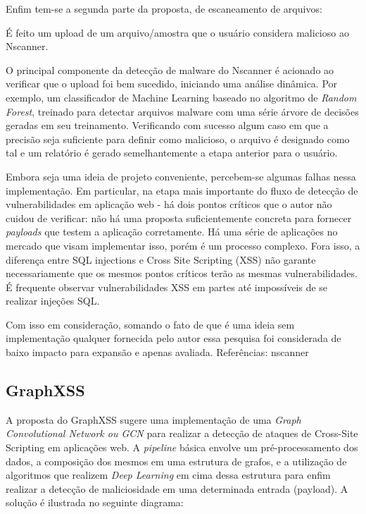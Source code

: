 Enfim tem-se a segunda parte da proposta, de escaneamento de arquivos:
\begin{alineas}
\item É feito um upload de um arquivo/amostra que o usuário considera malicioso ao Nscanner.
\item O principal componente da detecção de malware do Nscanner é acionado ao verificar que o upload foi bem sucedido, iniciando uma análise dinâmica. Por exemplo, um classificador de Machine Learning baseado no algoritmo de \textit{Random Forest}, treinado para detectar arquivos malware com uma série árvore de decisões geradas em seu treinamento. Verificando com sucesso algum caso em que a precisão seja suficiente para definir como malicioso, o arquivo é designado como tal e um relatório é gerado semelhantemente a etapa anterior para o usuário.
\end{alineas}

Embora seja uma ideia de projeto conveniente, percebem-se algumas falhas nessa implementação. Em particular, na etapa mais importante do fluxo de detecção de vulnerabilidades em aplicação web - há dois pontos críticos que o autor não cuidou de verificar: não há uma proposta suficientemente concreta para fornecer \textit{payloads} que testem a aplicação corretamente. Há uma série de aplicações no mercado que visam implementar isso, porém é um processo complexo. Fora isso, a diferença entre SQL injections e Cross Site Scripting (XSS) não garante necessariamente que os mesmos pontos críticos terão as mesmas vulnerabilidades. É frequente observar vulnerabilidades XSS em partes até impossíveis de se realizar injeções SQL.

Com isso em consideração, somando o fato de que é uma ideia sem implementação qualquer fornecida pelo autor essa pesquisa foi considerada de baixo impacto para expansão e apenas avaliada.
Referências: nscanner

\subsection{GraphXSS}
A proposta do GraphXSS sugere uma implementação de uma \textit{Graph Convolutional Network ou GCN} para realizar a detecção de ataques de Cross-Site Scripting em aplicações web. A \textit{pipeline} básica envolve um pré-processamento dos dados, a composição dos mesmos em uma estrutura de grafos, e a utilização de algoritmos que realizem \textit{Deep Learning} em cima dessa estrutura para enfim realizar a detecção de maliciosidade em uma determinada entrada (payload). A solução é ilustrada no seguinte diagrama: 

